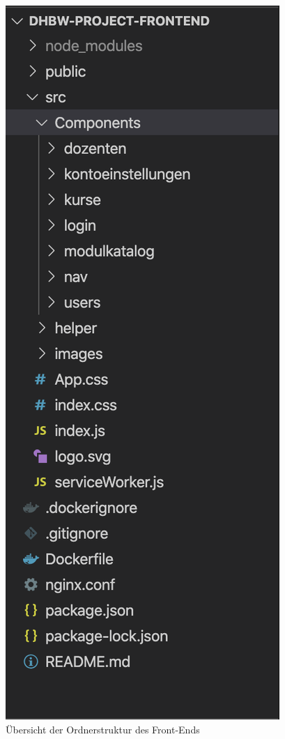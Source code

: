 \begin{figure}[H]
	\centering 
	\includegraphics[scale=0.75]{img/FrontEnd/front-end-ordnerstruktur}
	\caption[Übersicht der Ordnerstruktur des Front-Ends]{\label{fig:Front-End_Ordnerstruktur}Übersicht der Ordnerstruktur des Front-Ends\footnotemark}
\end{figure}

